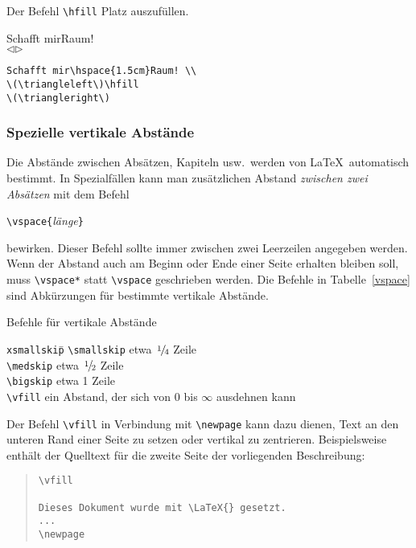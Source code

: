 Der Befehl \lstinline|\hfill|
Platz auszufüllen.
\exa
\raggedright
Schafft mir\hspace{1.5cm}Raum! \\
\(\triangleleft\)\hfill \(\triangleright\)\\
\exb
\begin{verbatim}
Schafft mir\hspace{1.5cm}Raum! \\
\(\triangleleft\)\hfill 
\(\triangleright\)
\end{verbatim}
\exc


\subsubsection{Spezielle vertikale Abstände} \label{vabstaende}
 
Die Abstände zwischen Absätzen, Kapiteln usw.\ werden von
\LaTeX\ automatisch bestimmt.
In Spezialfällen kann man zusätzlichen Abstand
\emph{zwischen zwei Absätzen} mit dem Befehl
\begin{beispiel}
\lstinline|\vspace{|\textit{länge}\lstinline|}|
\end{beispiel}
bewirken.
Dieser Befehl sollte immer zwischen zwei Leerzeilen angegeben
werden.
Wenn der Abstand auch am Beginn oder Ende einer Seite erhalten
bleiben soll, muss \lstinline|\vspace*| statt \lstinline|\vspace|
geschrieben werden.
Die Befehle in Tabelle~\ref{vspace} sind Abkürzungen für
bestimmte vertikale Abstände.
\begin{table}[t]
\caption{Befehle für vertikale Abstände} \label{vspace}
\begin{lminipage}{13cm}
\begin{tabbing}
\texttt{xsmallskip}\qquad \= \kill
\lstinline|\smallskip| \> etwa \(\nfrac{1}{4}\) Zeile \\
\lstinline|\medskip|   \> etwa \(\nfrac{1}{2}\) Zeile \\
\lstinline|\bigskip|   \> etwa 1 Zeile \\
\lstinline|\vfill|     \> ein Abstand, der sich von 0 bis \(\infty\)
                     ausdehnen kann
\end{tabbing}
\end{lminipage}
\end{table}
Der Befehl \lstinline|\vfill|  in Verbindung mit \lstinline|\newpage|
kann dazu dienen, Text an den unteren Rand einer Seite zu setzen
oder vertikal zu zentrieren.  Beispielsweise enthält der Quelltext
für die zweite Seite der vorliegenden Beschreibung:
\begin{quote}
\begin{verbatim}
\vfill

Dieses Dokument wurde mit \LaTeX{} gesetzt.
...
\newpage
\end{verbatim}
\end{quote}
 
